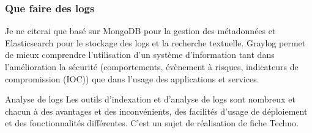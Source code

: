 \begin{frame}
\frametitle<presentation>{Que faire des logs}
\end{frame}

Je ne citerai que  basé sur MongoDB pour la gestion des métadonnées et Elasticsearch pour le stockage des logs et la recherche textuelle. Graylog  permet de mieux comprendre l’utilisation d'un système d'information tant dans l'amélioration la sécurité (comportements, évènement à risques, indicateurs de compromission (IOC)) que dans l'usage des applications et services.

\begin{warningbox}{Analyse de logs}
	Les outils d'indexation et d'analyse de logs sont nombreux et chacun à des avantages et des inconvénients, des facilités d'usage de déploiement et des fonctionnalités différentes. C'est un sujet de réalisation de fiche Techno.
\end{warningbox}




